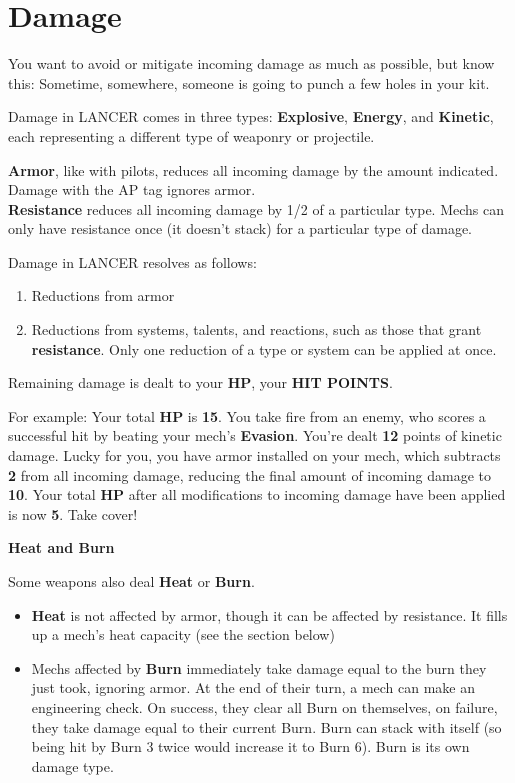 \section{Damage}

You want to avoid or mitigate incoming damage as much as possible, but know this: Sometime, somewhere, someone is going to punch a few holes in your kit. 

Damage in LANCER comes in three types: \textbf{Explosive}, \textbf{Energy}, and \textbf{Kinetic}, each representing a different type of weaponry or projectile. 

\textbf{Armor}, like with pilots, reduces all incoming damage by the amount indicated. Damage with the AP tag ignores armor.\\
\textbf{Resistance} reduces all incoming damage by 1/2 of a particular type. Mechs can only have resistance once (it doesn’t stack) for a particular type of damage. 

Damage in LANCER resolves as follows: 
\begin{enumerate}
\item Reductions from armor
\item Reductions from systems, talents, and reactions, such as those that grant \textbf{resistance}. Only one reduction of a type or system can be applied at once.
\end{enumerate}  
Remaining damage is dealt to your \textbf{HP}, your \textbf{HIT POINTS}. 

For example: Your total \textbf{HP} is  \textbf{15}. You take fire from an enemy, who scores a successful hit by beating your mech’s \textbf{Evasion}. You’re dealt \textbf{12} points of kinetic damage. Lucky for you, you have armor installed on your mech, which subtracts \textbf{2} from all incoming damage, reducing the final amount of incoming damage to  \textbf{10}. Your total \textbf{HP} after all modifications to incoming damage have been applied is now \textbf{5}. Take cover!

\begin{center}
  \textbf{Heat and Burn}
\end{center}

Some weapons also deal \textbf{Heat} or \textbf{Burn}.
\begin{itemize}
\item \textbf{Heat} is not affected by armor, though it can be affected by resistance. It fills up a mech’s heat capacity (see the section below) 
\item Mechs affected by \textbf{Burn} immediately take damage equal to the burn they just took, ignoring armor. At the end of their turn, a mech can make an engineering check. On success, they clear all Burn on themselves, on failure, they take damage equal to their current Burn. Burn can stack with itself (so being hit by Burn 3 twice would increase it to Burn 6). Burn is its own damage type.
\end{itemize}
  
